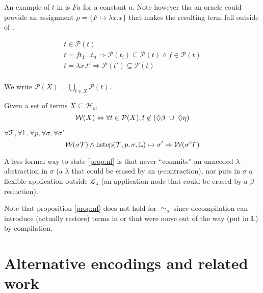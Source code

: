 \documentclass[sigconf,natbib=false,review]{acmart}
\newcommand{\UnifRel}{\ensuremath{\simeq}}
\newcommand{\Uo}{\ensuremath{\UnifRel_o}\xspace}
\newcommand{\llambda}{\ensuremath{\mathcal{L}_\lambda}\xspace}
\newcommand{\Ho}{\ensuremath{\mathcal{H}_o}\xspace}
\begin{document}
\noindent
An example of $t$ in \maybebeta{} is $F a$ for a constant $a$. Note however tha
an oracle could provide an assignment $\rho = \{ F \mapsto \lambda x.x\}$
that makes the resulting term fall outside of \maybebeta. 

\begin{definition}
$$
\begin{array}{l}
t \in \mathcal{P}(t)\\
t = f t_1\ldots t_n \Rightarrow \mathcal{P}(t_i) \subseteq \mathcal{P}(t) \land f \in \mathcal{P}(t)\\
t = \lambda x.t' \Rightarrow \mathcal{P}(t') \subseteq \mathcal{P}(t)\\
\end{array}
$$
\end{definition}

\noindent
We write $\mathcal{P}(X) = \bigcup_{t\in X} \mathcal{P}(t)$.

\newcommand{\wellb}{\ensuremath{\mathcal{W}}}
\begin{definition}
Given a set of terms $X \subseteq \Ho{}$,
$$
\wellb(X) \Leftrightarrow \forall t \in \mathcal{P}(X), t \not\in (\maybebeta{} ~\cup~ \maybeeta{})
$$
\end{definition}

\noindent

\begin{proposition}[\wellb{}-preservation]\label{prop:nf}
$\forall \mathcal{T}, \forall \mathbb{L}, \forall p, \forall \sigma, \forall \sigma'$
$$
\wellb(\sigma\mathcal{T}) \land
\stepH{\mathcal{T}}{p}{\sigma}{\mathbb{L}}{\sigma'}
\Rightarrow \wellb(\sigma' \mathcal{T})
$$
\end{proposition}

\noindent
A less formal way to state \ref{prop:nf} is that \hstep{} never
``commits'' an unneeded $\lambda$-abstraction in $\sigma$ (a $\lambda$
that could be erased by an $\eta$-contraction),
nor puts in $\sigma$ a flexible application outside \llambda{} (an application
node that could be erased by a $\beta$-reduction).

Note that proposition \ref{prop:nf} does not hold for \Uo{} since
decompilation can introduce (actually restore) terms in
\maybeeta or \maybebeta that were move out of the way (put in $\mathbb{L}$)
by compilation.

\section{Alternative encodings and related work}
\end{document}
